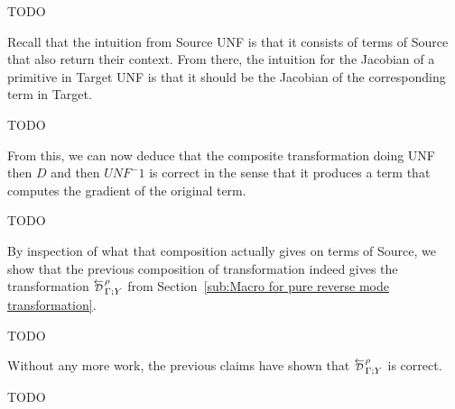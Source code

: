 \begin{proposition}[Correctness $D$]
    TODO
\end{proposition}

Recall that the intuition from Source UNF is that it consists of terms of Source that also return their context.
From there, the intuition for the Jacobian of a primitive in Target UNF is that it should be the Jacobian of
the corresponding term in Target. 


\begin{proposition}
    TODO
\end{proposition}

From this, we can now deduce that the composite transformation doing UNF then $D$ and then $UNF^-1$ is correct
in the sense that it produces a term that computes the gradient of the original term.

\begin{theorem}
    TODO
\end{theorem}

By inspection of what that composition actually gives on terms of Source, 
we show that the previous composition of transformation indeed gives the transformation 
$\directD{\rho}{\Gamma}{Y}$ from Section~\ref{sub:Macro for pure reverse mode transformation}. 

\begin{proposition}[UNF;D;$UNF^-1$=D]
    TODO
\end{proposition}

Without any more work, the previous claims have shown that 
$\directD{\rho}{\Gamma}{Y}$ is correct.

\begin{theorem}[D is correct]
    TODO
\end{theorem}